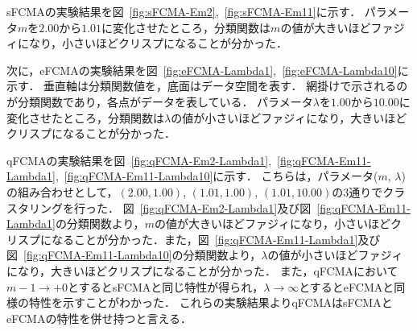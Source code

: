 \documentclass[a4j,12pt,dvipdfmx,oneside]{jsbook}
\theoremstyle{definition}
\begin{document}
sFCMAの実験結果を図~\ref{fig:sFCMA-Em2},~\ref{fig:sFCMA-Em11}に示す．
パラメータ$m$を$2.00$から$1.01$に変化させたところ，分類関数は$m$の値が大きいほどファジィになり，小さいほどクリスプになることが分かった．

次に，eFCMAの実験結果を図~\ref{fig:eFCMA-Lambda1},~\ref{fig:eFCMA-Lambda10}に示す．
垂直軸は分類関数値を，底面はデータ空間を表す．
網掛けで示されるのが分類関数であり，各点がデータを表している．
パラメータ$\lambda$を$1.00$から$10.00$に変化させたところ，分類関数は$\lambda$の値が小さいほどファジィになり，大きいほどクリスプになることが分かった．

qFCMAの実験結果を図~\ref{fig:qFCMA-Em2-Lambda1},~\ref{fig:qFCMA-Em11-Lambda1},~\ref{fig:qFCMA-Em11-Lambda10}に示す．
こちらは，パラメータ($m$, $\lambda$)の組み合わせとして，$(2.00, 1.00)$, $(1.01, 1.00)$, $(1.01, 10.00)$の3通りでクラスタリングを行った．
図~\ref{fig:qFCMA-Em2-Lambda1}及び図~\ref{fig:qFCMA-Em11-Lambda1}の分類関数より，$m$の値が大きいほどファジィになり，小さいほどクリスプになることが分かった．また，図~\ref{fig:qFCMA-Em11-Lambda1}及び図~\ref{fig:qFCMA-Em11-Lambda10}の分類関数より，$\lambda$の値が小さいほどファジィになり，大きいほどクリスプになることが分かった．
また，qFCMAにおいて$m-1\rightarrow+0$とするとsFCMAと同じ特性が得られ，$\lambda\rightarrow\infty$とするとeFCMAと同様の特性を示すことがわかった．
これらの実験結果よりqFCMAはsFCMAとeFCMAの特性を併せ持つと言える．
\end{document}
